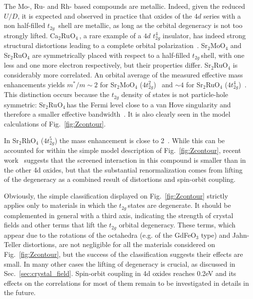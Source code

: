 \documentclass[]{ar2e-changed}%
\def\ttg{$t_{2g}\,$}
\def\SROtwo{Sr$_{2}$Ru$_{}$O$_{4}$\,}
\def\CROtwo{ Ca$_{2}$Ru$_{}$O$_{4}$\,}
\begin{document}
The Mo-, Ru- and Rh- based compounds are metallic. 
Indeed, given the reduced $U/D$, it is expected and observed in
practice that oxides of the $4d$ series with a non half-filled \ttg
shell are metallic, as long as the orbital degeneracy is not too strongly lifted. 
\CROtwo, a rare example of a $4d$ $t_{2g}^4$
insulator, has indeed strong structural distortions leading to a complete orbital
polarization~\cite{gorelov_ca2ruo4_prl_2010}.
%
Sr$_2$MoO$_4$ and Sr$_2$RuO$_4$ are symmetrically placed with respect
to a half-filled \ttg shell, with one less and one more electron respectively, 
but their properties differ. Sr$_2$RuO$_4$ is
considerably more correlated. An orbital average of the measured
effective mass enhancements yields $m^*/m\sim 2$ for
Sr$_2$MoO$_4$ ($4t_{2g}^2$)~\cite{ikeda_Sr2MoO4_jpsj_2000} and $\sim
4$ for Sr$_2$RuO$_4$ ($4t_{2g}^4$)~\cite{imada_mit_review,mackenzie_rmp_2003}.
%
This distinction 
occurs because the $t_{2g}$ density of states is not particle-hole symmetric: \SROtwo has
the Fermi level close to a van Hove singularity and therefore a
smaller effective bandwidth~\cite{mravlje11}.  It is also clearly 
seen in the model calculations of Fig.~\ref{fig:Zcontour}. 

In Sr$_2$RhO$_4$ ($4t_{2g}^5$) the mass enhancement is close to
2~\cite{perry_njp_2006,baumberger06}. 
%
While this can be accounted for within the simple model description of Fig.~\ref{fig:Zcontour},  
recent work~\cite{martins_iridates_rhodates_prl_2011} suggests that the screened interaction 
in this compound is smaller than in the other 4d oxides, but that
the substantial renormalization comes from lifting of the degeneracy as a 
combined result of distortions and spin-orbit coupling.  

Obviously, the simple classification displayed on Fig.~\ref{fig:Zcontour} strictly applies only to 
materials in which the \ttg states are degenerate. 
%
It should be complemented in general with a third axis, indicating the
strength of crystal fields and other terms that lift the $t_{2g}$
orbital degeneracy. These terms, which appear due to the rotations of
the octahedra (e.g. of the GdFeO$_3$ type) and Jahn-Teller
distortions, are not negligible for all the materials considered on
Fig.~\ref{fig:Zcontour}, but the success of the classification
suggests their effects are small. In many other cases the lifting of degeneracy is
crucial, as discussed in Sec.~\ref{sec:crystal_field}. 
%
Spin-orbit coupling in 4d oxides reaches
0.2eV and its effects on the correlations for most of them remain to
be investigated in details in the future.
\end{document}
